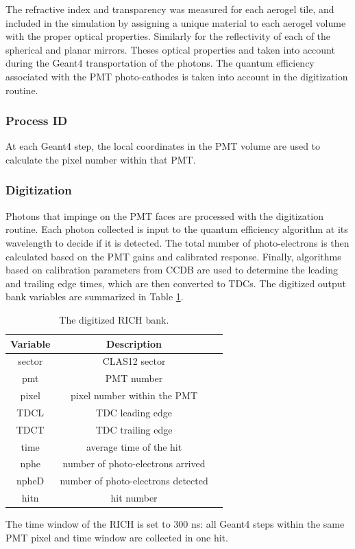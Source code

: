 The refractive index and transparency was measured for each aerogel tile, and included in the simulation by
assigning a unique material to each aerogel volume with the proper optical properties.
Similarly for the reflectivity of each of the spherical and planar mirrors.
Theses optical properties and taken into account during the Geant4 transportation of the photons.
The quantum efficiency associated with the PMT photo-cathodes is taken into account in the digitization routine.

\subsubsection{Process ID}
At each Geant4 step, the local coordinates in the PMT volume are used to calculate the pixel number within that PMT.

\subsubsection{Digitization}

Photons that impinge on the PMT faces are processed with the digitization routine.
Each photon collected is input to the quantum efficiency algorithm at its wavelength to decide if it is detected.
The total number of photo-electrons is then calculated based on the PMT gains and calibrated response.
Finally, algorithms based on calibration parameters from CCDB are used to determine the leading and trailing edge times, which are
then converted to TDCs.
The digitized output bank variables are summarized in Table \ref{tab:richBank}.

\begin{table}[h]
	\begin{center}
		\begin{tabular}{| c | c | c |}
			\hline \hline
			Variable & Description                                         \\
			\hline
             sector  &                                     CLAS12 sector   \\
                pmt  &                                        PMT number   \\
              pixel  &                       pixel number within the PMT   \\
               TDCL  &                                  TDC leading edge   \\
               TDCT  &                                 TDC trailing edge   \\
               time  &                           average time of the hit   \\
               nphe  &                  number of photo-electrons arrived   \\
              npheD  &                 number of photo-electrons detected   \\
               hitn  &                                        hit number   \\
			\hline \hline
		\end{tabular}
	\end{center}
	\caption{The digitized RICH bank.}\label{tab:richBank}
\end{table}

The time window  of the RICH is set to 300 ns: all Geant4 steps within the same PMT pixel and time window are collected in one hit.
